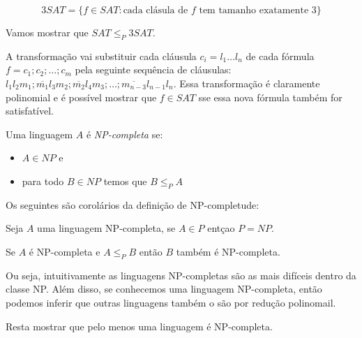 \begin{example}
  \begin{displaymath}
    3SAT = \{f \in SAT : \textrm{cada clásula de $f$ tem tamanho exatamente 3}\}
  \end{displaymath}

  Vamos mostrar que $SAT \leq_P 3SAT$.

  A transformação vai substituir cada cláusula $c_i = l_1 \dots l_n$ de cada fórmula $f = c_1;c_2; \dots; c_m$ pela seguinte sequência de cláusulas: $l_1l_2m_1;\overline{m_1}l_3m_2;\overline{m_2}l_4m_3; \dots ; \overline{m_{n-3}}l_{n-1}l_n$.
  Essa transformação é claramente polinomial e é possível mostrar que $f \in SAT$ sse essa nova fórmula também for satisfatível. 
\end{example}

Uma linguagem $A$ é {\em NP-completa} se:
\begin{itemize}
\item $A \in NP$ e
\item para todo $B \in NP$ temos que $B \leq_P A$  
\end{itemize}

Os seguintes são corolários da definição de NP-completude:

\begin{corollary}
  Seja $A$ uma linguagem NP-completa, se $A \in P$ entçao $P = NP$.  
\end{corollary}

\begin{corollary}
  Se $A$ é NP-completa e $A \leq_P B$ então $B$ também é NP-completa.
\end{corollary}

Ou seja, intuitivamente as linguagens NP-completas são as mais difíceis dentro da classe NP.
Além disso, se conhecemos uma linguagem NP-completa, então podemos inferir que outras linguagens também o são por redução polinomail.

Resta mostrar que pelo menos uma linguagem é NP-completa.

